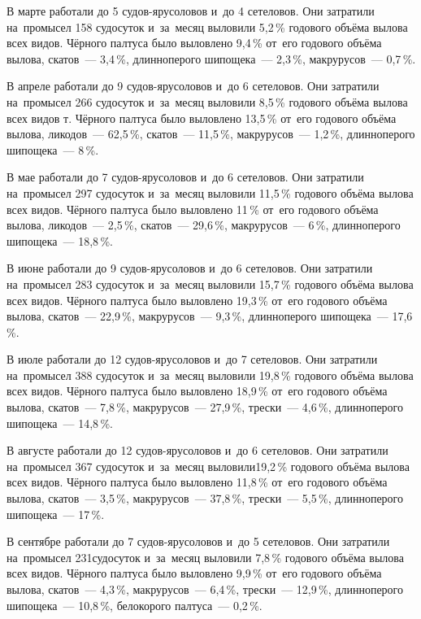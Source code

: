 В марте работали до 5 судов-ярусоловов и~до 4 сетеловов. Они затратили на~промысел 158 судосуток и~за~месяц выловили 5,2\,\% годового объёма вылова всех видов. Чёрного палтуса было выловлено 9,4\,\% от~его годового объёма вылова, скатов~--- 3,4\,\%, длинноперого шипощека~--- 2,3\,\%, макрурусов~--- 0,7\,\%.

В апреле работали до 9 судов-ярусоловов и~до 6 сетеловов. Они затратили на~промысел 266 судосуток и~за~месяц выловили 8,5\,\% годового объёма вылова всех видов т. Чёрного палтуса было выловлено 13,5\,\% от~его годового объёма вылова, ликодов~--- 62,5\,\%, скатов~--- 11,5\,\%, макрурусов~--- 1,2\,\%, длинноперого шипощека~--- 8\,\%.

В мае работали до 7 судов-ярусоловов и~до 6 сетеловов. Они затратили на~промысел 297 судосуток и~за~месяц выловили 11,5\,\% годового объёма вылова всех видов. Чёрного палтуса было выловлено 11\,\% от~его годового объёма вылова, ликодов~--- 2,5\,\%, скатов~--- 29,6\,\%, макрурусов~--- 6\,\%, длинноперого шипощека~--- 18,8\,\%.

В июне работали до 9 судов-ярусоловов и~до 6 сетеловов. Они затратили на~промысел 283 судосуток и~за~месяц выловили 15,7\,\% годового объёма вылова всех видов. Чёрного палтуса было выловлено 19,3\,\% от~его годового объёма вылова, скатов~--- 22,9\,\%, макрурусов~--- 9,3\,\%, длинноперого шипощека~--- 17,6\,\%.

В июле работали до 12 судов-ярусоловов и~до 7 сетеловов. Они затратили на~промысел 388 судосуток и~за~месяц выловили 19,8\,\% годового объёма вылова всех видов. Чёрного палтуса было выловлено 18,9\,\% от~его годового объёма вылова, скатов~--- 7,8\,\%, макрурусов~--- 27,9\,\%, трески~--- 4,6\,\%, длинноперого шипощека~--- 14,8\,\%.

В августе работали до 12 судов-ярусоловов и~до 6 сетеловов. Они затратили на~промысел 367 судосуток и~за~месяц выловили19,2\,\% годового объёма вылова всех видов. Чёрного палтуса было выловлено 11,8\,\% от~его годового объёма вылова, скатов~--- 3,5\,\%, макрурусов~--- 37,8\,\%, трески~--- 5,5\,\%, длинноперого шипощека~--- 17\,\%.

В сентябре работали до 7 судов-ярусоловов и~до 5 сетеловов. Они затратили на~промысел 231судосуток и~за~месяц выловили 7,8\,\% годового объёма вылова всех видов. Чёрного палтуса было выловлено 9,9\,\% от~его годового объёма вылова, скатов~--- 4,3\,\%, макрурусов~--- 6,4\,\%, трески~--- 12,9\,\%, длинноперого шипощека~--- 10,8\,\%, белокорого палтуса~--- 0,2\,\%.

